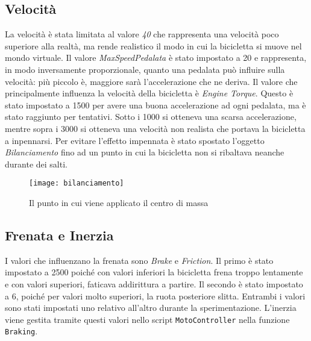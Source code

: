 \subsection{Velocità}
La velocità è stata limitata al valore \textit{40} che rappresenta una velocità poco superiore alla realtà, ma rende realistico il modo in cui la bicicletta si muove nel mondo virtuale. Il valore \textit{MaxSpeedPedalata} è stato impostato a 20 e rappresenta, in modo inversamente proporzionale, quanto una pedalata può influire sulla velocità: più piccolo è, maggiore sarà l'accelerazione che ne deriva. Il valore che principalmente influenza la velocità della bicicletta è \textit{Engine Torque}. Questo è stato impostato a 1500 per avere una buona accelerazione ad ogni pedalata, ma è stato raggiunto per tentativi. Sotto i 1000 si otteneva una scarsa accelerazione, mentre sopra i 3000 si otteneva una velocità non realista che portava la bicicletta a inpennarsi. Per evitare l'effetto impennata è stato spostato l'oggetto \textit{Bilanciamento} fino ad un punto in cui la bicicletta non si ribaltava neanche durante dei salti.
 \begin{figure}[htb]
    \centering
    \texttt{[image: bilanciamento]}
    \caption{Il punto in cui viene applicato il centro di massa\label{fig:bilanciamento}}
\end{figure}

\subsection{Frenata e Inerzia}
I valori che influenzano la frenata sono \textit{Brake} e \textit{Friction}. Il primo è stato impostato a 2500 poiché con valori inferiori la bicicletta frena troppo lentamente e con valori superiori, faticava addirittura a partire. Il secondo è stato impostato a 6, poiché per valori molto superiori, la ruota posteriore slitta. Entrambi i valori sono stati impostati uno relativo all'altro durante la sperimentazione. L'inerzia viene gestita tramite questi valori nello script \texttt{MotoController} nella funzione \texttt{Braking}.







































%